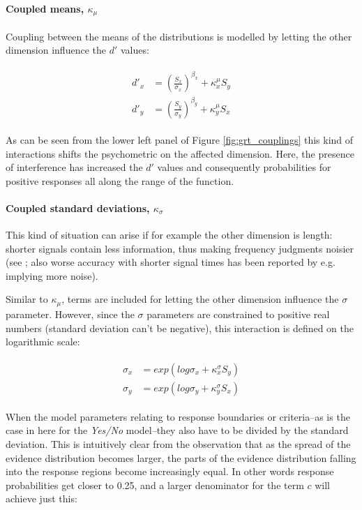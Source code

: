 \documentclass{article}\usepackage{knitr}
\begin{document}
\paragraph{Coupled means, $\kappa_{\mu}$}

Coupling between the means of the distributions is modelled by letting the other dimension influence the $d'$ values: 

\begin{align}
\label{eq:kappa_mu}
\begin{split}
d'_x &= (\frac{S_x}{\sigma_x})^{\beta_x} + \kappa_x^{\mu} S_y \\
d'_y &= (\frac{S_y}{\sigma_y})^{\beta_y} + \kappa_y^{\mu} S_x
\end{split}
\end{align}

As can be seen from the lower left panel of Figure \ref{fig:grt_couplings} this kind of interactions shifts the psychometric on the affected dimension. Here, the presence of interference has increased the $d'$ values and consequently probabilities for positive responses all along the range of the function.

\paragraph{Coupled standard deviations, $\kappa_{\sigma}$}

This kind of situation can arise if for example the other dimension is length: shorter signals contain less information, thus making frequency judgments noisier (see \citet[p.274]{houtsma1995}; also worse accuracy with shorter signal times has been reported by e.g. \cite{townsend1988} implying more noise).

Similar to $\kappa_{\mu}$, terms are included for letting the other dimension influence the $\sigma$ parameter. However, since the $\sigma$ parameters are constrained to positive real numbers (standard deviation can't be negative), this interaction is defined on the logarithmic scale:

\begin{align}
\label{eq:varshift}
\begin{split}
\sigma_x &= exp(log\sigma_x + \kappa_x^{\sigma} S_y) \\
\sigma_y &= exp(log\sigma_y + \kappa_y^{\sigma} S_x)
\end{split}
\end{align}

When the model parameters relating to response boundaries or criteria--as is the case in here for the \textit{Yes/No} model--they also have to be divided by the standard deviation. This is intuitively clear from the observation that as the spread of the evidence distribution becomes larger, the parts of the evidence distribution falling into the response regions become increasingly equal. In other words response probabilities get closer to 0.25, and a larger denominator for the term $c$ will achieve just this:
\end{document}
